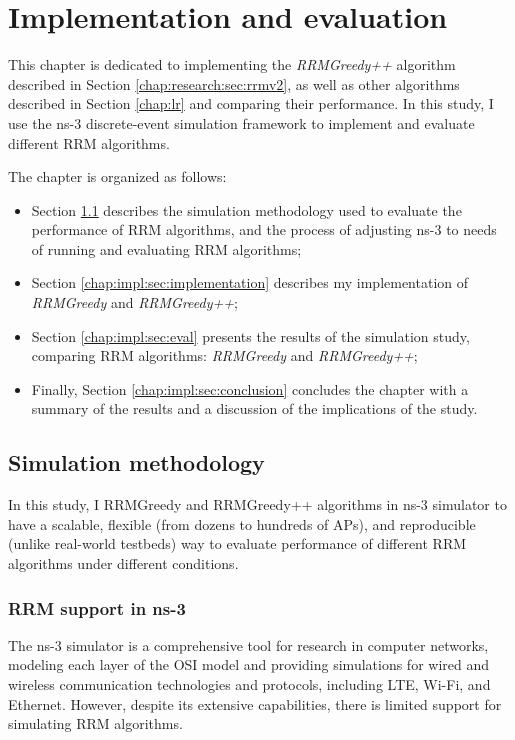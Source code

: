 \chapter{Implementation and evaluation}
\label{chap:impl}


This chapter is dedicated to implementing the \textit{RRMGreedy++} algorithm described in Section \ref{chap:research:sec:rrmv2}, as well as other algorithms described in Section \ref{chap:lr} and comparing their performance. In this study, I use the ns-3 discrete-event simulation framework to implement and evaluate different RRM algorithms.

The chapter is organized as follows:
\begin{itemize}
    \item Section \ref{chap:impl:sec:simulation_method} describes the simulation methodology used to evaluate the performance of RRM algorithms, and the process of adjusting ns-3 to needs of running and evaluating RRM algorithms;
    \item Section \ref{chap:impl:sec:implementation} describes my implementation of \textit{RRMGreedy} and \textit{RRMGreedy++}; %
    \item Section \ref{chap:impl:sec:eval} presents the results of the simulation study, comparing RRM algorithms: \textit{RRMGreedy} and \textit{RRMGreedy++};%
    \item Finally, Section \ref{chap:impl:sec:conclusion} concludes the chapter with a summary of the results and a discussion of the implications of the study.

\end{itemize}

\section{Simulation methodology}
\label{chap:impl:sec:simulation_method}
In this study, I %
RRMGreedy and RRMGreedy++ algorithms in ns-3 simulator to have a scalable, flexible (from dozens to hundreds of APs), and reproducible (unlike real-world testbeds) way to evaluate performance of different RRM algorithms under different conditions.

\subsection{RRM support in ns-3}
The ns-3 simulator is a comprehensive tool for research in computer networks, modeling each layer of the OSI model and providing simulations for wired and wireless communication technologies and protocols, including LTE, Wi-Fi, and Ethernet. However, despite its extensive capabilities, there is limited support for simulating RRM algorithms.


